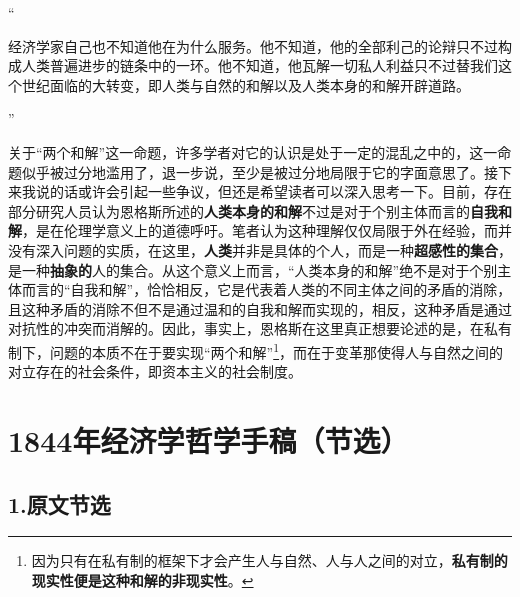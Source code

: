 \documentclass[a4paper,twoside,12pt]{ctexart}
\begin{document}
“\begin{fangsong}
经济学家自己也不知道他在为什么服务。他不知道，他的全部利己的论辩只不过构成人类普遍进步的链条中的一环。他不知道，他瓦解一切私人利益只不过替我们这个世纪面临的大转变，即人类与自然的和解以及人类本身的和解开辟道路。    
\end{fangsong}”

关于“两个和解”这一命题，许多学者对它的认识是处于一定的混乱之中的，这一命题似乎被过分地滥用了，退一步说，至少是被过分地局限于它的字面意思了。接下来我说的话或许会引起一些争议，但还是希望读者可以深入思考一下。目前，存在部分研究人员认为恩格斯所述的\textbf{人类本身的和解}不过是对于个别主体而言的\textbf{自我和解}，是在伦理学意义上的道德呼吁。笔者认为这种理解仅仅局限于外在经验，而并没有深入问题的实质，在这里，\textbf{人类}并非是具体的个人，而是一种\textbf{超感性的集合}，是一种\textbf{抽象的}人的集合。从这个意义上而言，“人类本身的和解”绝不是对于个别主体而言的“自我和解”，恰恰相反，它是代表着人类的不同主体之间的矛盾的消除，且这种矛盾的消除不但不是通过温和的自我和解而实现的，相反，这种矛盾是通过对抗性的冲突而消解的。因此，事实上，恩格斯在这里真正想要论述的是，在私有制下，问题的本质不在于要实现“两个和解”\footnote{因为只有在私有制的框架下才会产生人与自然、人与人之间的对立，\textbf{私有制的现实性便是这种和解的非现实性}。}，而在于变革那使得人与自然之间的对立存在的社会条件，即资本主义的社会制度。
\newpage
\section{1844年经济学哲学手稿（节选）}
\subsection{1.原文节选}
\end{document}
